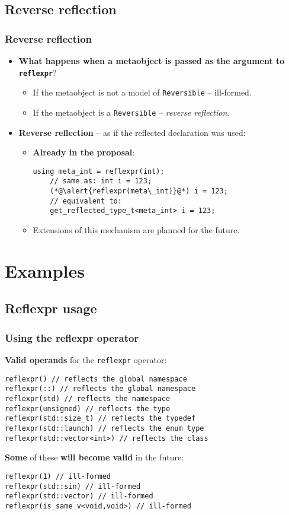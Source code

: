 \documentclass[compress,table,xcolor=table]{beamer}
\begin{document}
\subsection{Reverse reflection}
\begin{frame}[fragile]
\frametitle{Reverse reflection}
  \begin{itemize}
    \item {\large \textbf{What happens when a metaobject is passed as the argument
      to \texttt{reflexpr}}?}
    \begin{itemize}
      \item If the metaobject is not a model of \texttt{Reversible} -- ill-formed.
      \item If the metaobject is a \texttt{Reversible} -- {\em reverse reflection}.
    \end{itemize}
    \item \textbf{Reverse reflection} -- as if the reflected declaration was used:
    \begin{itemize}
      \item \textbf{Already in the proposal}:
      \begin{lstlisting}[basicstyle=\small\ttfamily]
	using meta_int = reflexpr(int);
	// same as: int i = 123;
	(*@\alert{reflexpr(meta\_int)}@*) i = 123;
	// equivalent to:
	get_reflected_type_t<meta_int> i = 123;
      \end{lstlisting}
      \item Extensions of this mechanism are planned for the future.
    \end{itemize}
  \end{itemize}
\end{frame}

\section{Examples}

\subsection{Reflexpr usage}
\begin{frame}[fragile]
\frametitle{Using the reflexpr operator}

\textbf{Valid operands} for the \texttt{reflexpr} operator:
\begin{lstlisting}[basicstyle=\small\ttfamily]
reflexpr() // reflects the global namespace
reflexpr(::) // reflects the global namespace
reflexpr(std) // reflects the namespace
reflexpr(unsigned) // reflects the type
reflexpr(std::size_t) // reflects the typedef
reflexpr(std::launch) // reflects the enum type
reflexpr(std::vector<int>) // reflects the class
\end{lstlisting}

\textbf{Some} of these \textbf{will become valid} in the future:
\begin{lstlisting}[basicstyle=\small\ttfamily]
reflexpr(1) // ill-formed
reflexpr(std::sin) // ill-formed
reflexpr(std::vector) // ill-formed
reflexpr(is_same_v<void,void>) // ill-formed
\end{lstlisting}
\end{frame}
\end{document}
